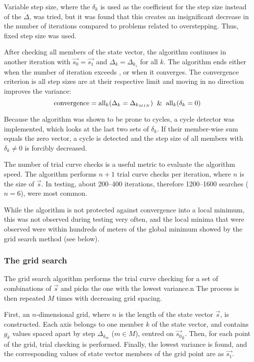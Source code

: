 Variable step size, where the $\delta_k$ is used as the coefficient for the step size instead of the $\dot\Delta$, was tried, but it was found that this creates an insignificant decrease in the number of iterations compared to problems related to overstepping. Thus, fixed step size was used.

After checking all members of the state vector, the algorithm continues in another iteration with $\Vec{s_0} = \Vec{s_1}$ and  $\Delta_k = \Delta_{k_1}$ for all $k$. The algorithm ends either when the number of iteration exceeds , or when it converges. The convergence criterion is all step sizes are at their respective limit and moving in no direction improves the variance:
\begin{equation*}
    \text{convergence} = \text{all}_k(\Delta_k = \Delta_{k_{MIN}}) \And \text{all}_k(\delta_k = 0)
\end{equation*}

Because the algorithm was shown to be prone to cycles, a cycle detector was implemented, which looks at the last two sets of $\delta_k$. If their member-wise sum equals the zero vector, a cycle is detected and the step size of all members with $\delta_k \not= 0$ is forcibly decreased.

The number of trial curve checks is a useful metric to evaluate the algorithm speed. The algorithm performs $n+1$ trial curve checks per iteration, where $n$ is the size of $\Vec{s}$. In testing, about \numrange{200}{400} iterations, therefore \numrange{1200}{1600} searches ($n = 6$), were most common.

While the algorithm is not protected against convergence into a local minimum, this was not observed during testing very often, and the local minima that were observed were within hundreds of meters of the global minimum showed by the grid search method (see below).


\subsubsection{The grid search}
The grid search algorithm performs the trial curve checking for a set of combinations of $\Vec{s}$ and picks the one with the lowest variance.n The process is then repeated $M$ times with decreasing grid spacing.

First, an $n$-dimensional grid, where $n$ is the length of the state vector $\Vec{s}$, is constructed. Each axis belongs to one member $k$ of the state vector, and contains $g_k$ values spaced apart by step $\Delta_{k_m}$ ($m \in M$), centred on $\Vec{s_0}_k$. Then, for each point of the grid, trial checking is performed. Finally, the lowest variance is found, and the corresponding values of state vector members of the grid point are as $\Vec{s_1}$.

